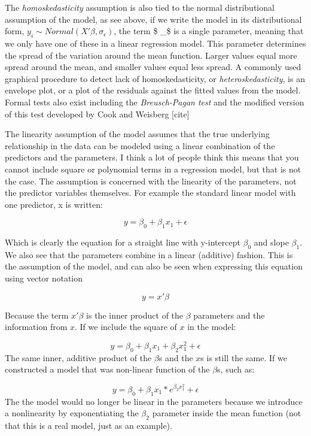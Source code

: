 \documentclass[
]{article}
\begin{document}
The \emph{homoskedasticity} assumption is also tied to the normal distributional assumption of the model, as see above, if we write the model in its distributional form, \(y_i \sim Normal(X' \beta, \sigma_\epsilon)\), the term \$ \sigma\_\epsilon\$ is a single parameter, meaning that we only have one of these in a linear regression model. This parameter determines the spread of the variation around the mean function. Larger values equal more spread around the mean, and smaller values equal less spread. A commonly used graphical procedure to detect lack of homoskedasticity, or \emph{heteroskedasticity}, is an envelope plot, or a plot of the residuals against the fitted values from the model. Formal tests also exist including the \emph{Breusch-Pagan test} and the modified version of this test developed by Cook and Weisberg {[}cite{]}

The linearity assumption of the model assumes that the true underlying relationship in the data can be modeled using a linear combination of the predictors and the parameters. I think a lot of people think this means that you cannot include square or polynomial terms in a regression model, but that is not the case. The assumption is concerned with the linearity of the parameters, not the predictor variables themselves. For example the standard linear model with one predictor, x is written:

\[y = \beta_0 + \beta_1 x_1 + \epsilon\]

Which is clearly the equation for a straight line with y-intercept \(\beta_0\) and slope \(\beta_1\). We also see that the parameters combine in a linear (additive) fashion. This is the assumption of the model, and can also be seen when expressing this equation using vector notation

\[y = x' \beta\]

Because the term \(x' \beta\) is the inner product of the \(\beta\) parameters and the information from \(x\). If we include the square of \(x\) in the model:

\[y = \beta_0 + \beta_1 x_1 + \beta_2 x_1^2 + \epsilon\]
The same inner, additive product of the \(\beta\)s and the \(x\)s is still the same. If we constructed a model that was non-linear function of the \(\beta\)s, such as:

\[y = \beta_0 + \beta_1 x_1 *  e^{\beta_2 x_1^2} + \epsilon\]
The the model would no longer be linear in the parameters because we introduce a nonlinearity by exponentiating the \(\beta_2\) parameter inside the mean function (not that this is a real model, just as an example).
\end{document}
